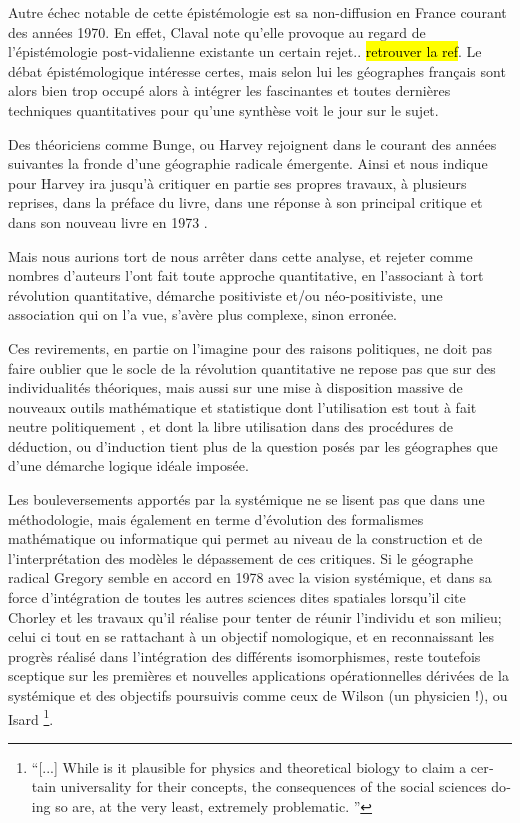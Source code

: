 Autre échec notable de cette épistémologie est sa non-diffusion en France courant des années 1970. En effet, Claval note qu'elle provoque au regard de l'épistémologie post-vidalienne existante un certain rejet.. \hl{retrouver la ref}. Le débat épistémologique intéresse certes, mais selon lui les géographes français sont alors bien trop occupé alors à intégrer les fascinantes et toutes dernières techniques quantitatives pour qu'une synthèse voit le jour sur le sujet.\autocite[27-29]{Claval2003}

Des théoriciens comme Bunge, ou Harvey rejoignent dans le courant des années suivantes la fronde d'une géographie radicale émergente. Ainsi \textcite[30]{Johnston2008} et \textcite[37]{Barnes2006} nous indique pour Harvey ira jusqu'à critiquer en partie ses propres travaux, à plusieurs reprises, dans la préface du livre, dans une réponse à son principal critique \textcite{Gale1972} et dans son nouveau livre en 1973 \autocite{Harvey1972} \autocite[166-168]{Gould2004}. 

Mais nous aurions tort de nous arrêter dans cette analyse, et rejeter comme nombres d'auteurs l'ont fait toute approche quantitative, en l'associant à tort révolution quantitative, démarche positiviste et/ou néo-positiviste, une association qui on l'a vue, s'avère plus complexe, sinon erronée.

Ces revirements, en partie on l'imagine pour des raisons politiques, ne doit pas faire oublier que le socle de la révolution quantitative ne repose pas que sur des individualités théoriques, mais aussi sur une mise à disposition massive de nouveaux outils mathématique et statistique dont l'utilisation est tout à fait neutre politiquement \autocite{Sheppard2001}, et dont la libre utilisation dans des procédures de déduction, ou d'induction tient plus de la question posés par les géographes que d'une démarche logique idéale imposée. \autocite{Sanders2000}

Les bouleversements apportés par la systémique ne se lisent pas que dans une méthodologie, mais également en terme d'évolution des formalismes mathématique ou informatique qui permet au niveau de la construction et de l'interprétation des modèles le dépassement de ces critiques. Si le géographe radical Gregory semble en accord en 1978 avec la vision systémique, et dans sa force d'intégration de toutes les autres sciences dites spatiales lorsqu'il cite Chorley et les travaux qu'il réalise pour tenter de réunir l'individu et son milieu; celui ci tout en se rattachant à un objectif nomologique, et en reconnaissant les progrès réalisé dans l'intégration des différents isomorphismes, reste toutefois sceptique sur les premières et nouvelles applications opérationnelles dérivées de la systémique et des objectifs poursuivis comme ceux de Wilson (un physicien !), ou Isard \footnote{\foreignquote{english}{[...] While is it plausible for physics and theoretical biology to claim a certain universality for their concepts, the consequences of the social sciences doing so are, at the very least, extremely problematic. \autocite[73]{Gregory1978}}}.



